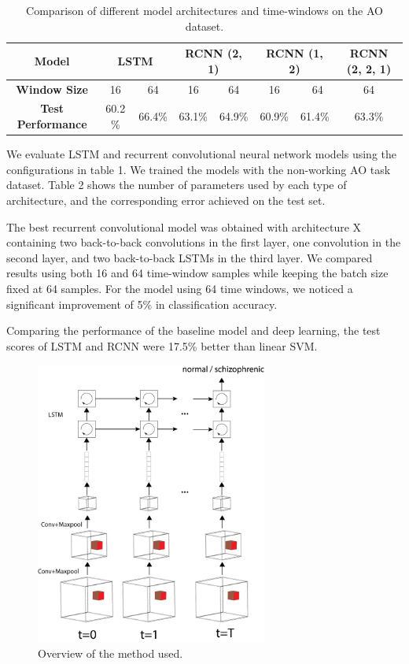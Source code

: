 \documentclass{article}
\begin{document}
\begin{table}[]
\centering
\caption{Comparison of different model architectures and time-windows on the AO dataset.}
\label{table_1}
\begin{tabular}{|c|c|c|c|c|c|c|c|}
\hline
\textbf{Model}           & \multicolumn{2}{c|}{\textbf{LSTM}} &
\multicolumn{2}{c|}{\textbf{RCNN (2, 1)}} & \multicolumn{2}{c|}{\textbf{RCNN (1, 2)}} & \textbf{RCNN (2, 2, 1)} \\ \hline
\textbf{Window Size}      & 16   & 64  & 16  & 64    &16    & \ 64    & 64           \\ \hline
\textbf{Test Performance} & 60.2 \%   & 66.4\%   & 63.1\% & 64.9\% & 60.9\%  & 61.4\%  & 63.3\%  \\  \hline
\end{tabular}
\end{table}


We evaluate LSTM and recurrent convolutional neural network models using the configurations in table 1. We trained the models with the non-working AO task dataset. Table 2 shows the number of parameters used by each type of architecture, and the corresponding error achieved on the test set.

The best recurrent convolutional model was obtained with architecture X containing two back-to-back convolutions in the first layer, one convolution in the second layer, and two back-to-back LSTMs in the third layer. We compared results using both 16 and 64 time-window samples while keeping the batch size fixed at 64 samples. For the model using 64 time windows, we noticed a significant improvement of 5\% in classification accuracy.

Comparing the performance of the baseline model and deep learning, the test scores of LSTM and RCNN were 17.5\% better than linear SVM.


\begin{figure}[t]
\begin{center}
\includegraphics[width=3in]{figures/overview.png}
\end{center}
\caption{Overview of the method used.}
\label{fig1}
\end{figure}
\end{document}
